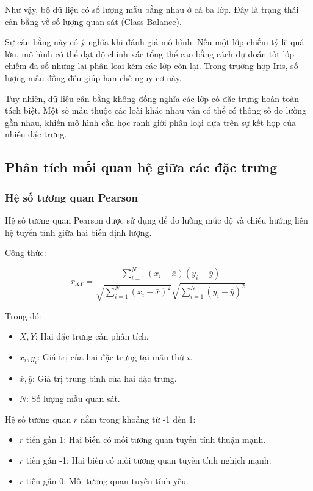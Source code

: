 \documentclass[14pt]{extarticle}
\begin{document}
	Như vậy, bộ dữ liệu có số lượng mẫu bằng nhau ở cả ba lớp. Đây là trạng thái cân bằng về số lượng quan sát (Class Balance).
	
	Sự cân bằng này có ý nghĩa khi đánh giá mô hình. Nếu một lớp chiếm tỷ lệ quá lớn, mô hình có thể đạt độ chính xác tổng thể cao bằng cách dự đoán tốt lớp chiếm đa số nhưng lại phân loại kém các lớp còn lại. Trong trường hợp Iris, số lượng mẫu đồng đều giúp hạn chế nguy cơ này.
	
	Tuy nhiên, dữ liệu cân bằng không đồng nghĩa các lớp có đặc trưng hoàn toàn tách biệt. Một số mẫu thuộc các loài khác nhau vẫn có thể có thông số đo lường gần nhau, khiến mô hình cần học ranh giới phân loại dựa trên sự kết hợp của nhiều đặc trưng.
	
	\subsection{Phân tích mối quan hệ giữa các đặc trưng}
	
	\subsubsection{Hệ số tương quan Pearson}
	
	Hệ số tương quan Pearson được sử dụng để đo lường mức độ và chiều hướng liên hệ tuyến tính giữa hai biến định lượng.
	
	Công thức:
	
	\[
	r_{XY}=
	\frac{
		\sum_{i=1}^{N}(x_i-\bar{x})(y_i-\bar{y})
	}{
		\sqrt{\sum_{i=1}^{N}(x_i-\bar{x})^2}
		\sqrt{\sum_{i=1}^{N}(y_i-\bar{y})^2}
	}
	\]
	
	Trong đó:
	
	\begin{itemize}
		\item $X,Y$: Hai đặc trưng cần phân tích.
		\item $x_i,y_i$: Giá trị của hai đặc trưng tại mẫu thứ $i$.
		\item $\bar{x},\bar{y}$: Giá trị trung bình của hai đặc trưng.
		\item $N$: Số lượng mẫu quan sát.
	\end{itemize}
	
	Hệ số tương quan $r$ nằm trong khoảng từ -1 đến 1:
	
	\begin{itemize}
		\item $r$ tiến gần 1: Hai biến có mối tương quan tuyến tính thuận mạnh.
		\item $r$ tiến gần -1: Hai biến có mối tương quan tuyến tính nghịch mạnh.
		\item $r$ tiến gần 0: Mối tương quan tuyến tính yếu.
	\end{itemize}
	
\end{document}
